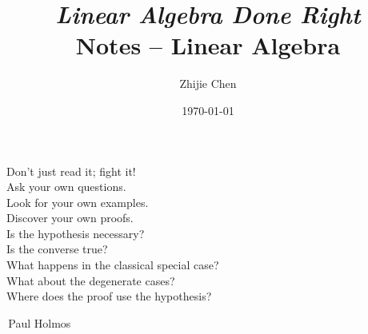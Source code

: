 \documentclass[nofonts,colorlinks]{tufte-handout}
\title{	
	\normalfont\normalsize 
	{\itshape Linear Algebra Done Right} \\ [0pt]
	\huge Notes -- Linear Algebra
}
\author{Zhijie Chen}
\date{\vspace{-5pt}\normalsize\today}
\theoremstyle{plain} %
\newtheorem{thm}{Theorem}
\newtheorem{lem}[thm]{Lemma}
\theoremstyle{definition}
\theoremstyle{remark}
\DeclareMathOperator{\spn}{span}
\begin{document}
\justifying
\maketitle
\tableofcontents
\newpage

\thispagestyle{empty}
\begin{fullwidth}
	\Large
	\vspace*{\fill}
	\begin{center}
		Don't just read it; fight it!\\
		Ask your own questions.\\
		Look for your own examples.\\
		Discover your own proofs.\\
		Is the hypothesis necessary?\\
		Is the converse true?\\
		What happens in the classical special case?\\
		What about the degenerate cases?\\
		Where does the proof use the hypothesis?
	\end{center}
	\begin{flushright}
		\textemdash\,Paul Holmos\phantom{mmmmmmmmmmmmmm}
	\end{flushright}
	\vspace*{\fill}
\end{fullwidth}
\newpage



\end{document}
